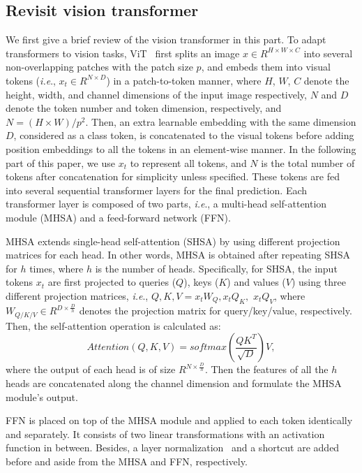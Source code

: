 \documentclass[twocolumn]{svjour3}          \smartqed  \usepackage{natbib}
\newcommand{\ie}{i.e}
\def\onedot{.\xspace}
\def\ie{\emph{i.e}\onedot}
\begin{document}
\subsection{Revisit vision transformer}
We first give a brief review of the vision transformer in this part. To adapt transformers to vision tasks, ViT~\citep{dosovitskiy2020image} first splits an image $x \in R^{H \times W \times C}$ into several non-overlapping patches with the patch size $p$, and embeds them into visual tokens (\ie, $ x_t \in R^{N \times D} $) in a patch-to-token manner, where $H$, $W$, $C$ denote the height, width, and channel dimensions of the input image respectively, $N$ and $D$ denote the token number and token dimension, respectively, and $N = (H\times W) / p^2$. Then, an extra learnable embedding with the same dimension $D$, considered as a class token, is concatenated to the visual tokens before adding position embeddings to all the tokens in an element-wise manner. In the following part of this paper, we use $x_t$ to represent all tokens, and $N$ is the total number of tokens after concatenation for simplicity unless specified. These tokens are fed into several sequential transformer layers for the final prediction. Each transformer layer is composed of two parts, \ie, a multi-head self-attention module (MHSA) and a feed-forward network (FFN).

MHSA extends single-head self-attention (SHSA) by using different projection matrices for each head. In other words, MHSA is obtained after repeating SHSA for $h$ times, where $h$ is the number of heads. Specifically, for SHSA, the input tokens $x_t$ are first projected to queries ($Q$), keys ($K$) and values ($V$) using three different projection matrices, \ie, $Q,K,V = x_t W_Q, x_t Q_K,$ $ x_t Q_V$, where $W_{Q/K/V} \in R^{D \times \frac{D}{h}}$ denotes the projection matrix for query/key/value, respectively. Then, the self-attention operation is calculated as:
\begin{equation}
    Attention(Q, K, V) = softmax(\frac{QK^T}{\sqrt{D}})V,
\end{equation}
where the output of each head is of size $R^{N \times \frac{D}{h}}$. Then the features of all the $h$ heads are concatenated along the channel dimension and formulate the MHSA module's output.

FFN is placed on top of the MHSA module and applied to each token identically and separately. It consists of two linear transformations with an activation function in between. Besides, a layer normalization~\citep{ba2016layer} and a shortcut are added before and aside from the MHSA and FFN, respectively. 
\end{document}
